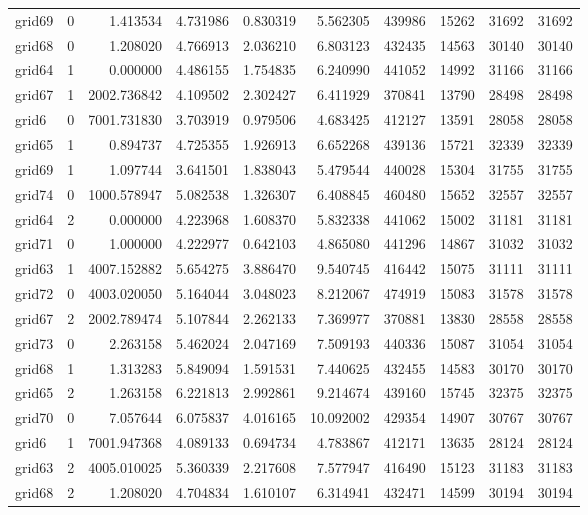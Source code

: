 \begin{longtable}{|l|r|r|r|r|r|r|r|r|r|}
grid69 & 0 & 1.413534 & 4.731986 & 0.830319 & 5.562305 & 439986 & 15262 & 31692 & 31692 \\
grid68 & 0 & 1.208020 & 4.766913 & 2.036210 & 6.803123 & 432435 & 14563 & 30140 & 30140 \\
grid64 & 1 & 0.000000 & 4.486155 & 1.754835 & 6.240990 & 441052 & 14992 & 31166 & 31166 \\
grid67 & 1 & 2002.736842 & 4.109502 & 2.302427 & 6.411929 & 370841 & 13790 & 28498 & 28498 \\
grid6 & 0 & 7001.731830 & 3.703919 & 0.979506 & 4.683425 & 412127 & 13591 & 28058 & 28058 \\
grid65 & 1 & 0.894737 & 4.725355 & 1.926913 & 6.652268 & 439136 & 15721 & 32339 & 32339 \\
grid69 & 1 & 1.097744 & 3.641501 & 1.838043 & 5.479544 & 440028 & 15304 & 31755 & 31755 \\
grid74 & 0 & 1000.578947 & 5.082538 & 1.326307 & 6.408845 & 460480 & 15652 & 32557 & 32557 \\
grid64 & 2 & 0.000000 & 4.223968 & 1.608370 & 5.832338 & 441062 & 15002 & 31181 & 31181 \\
grid71 & 0 & 1.000000 & 4.222977 & 0.642103 & 4.865080 & 441296 & 14867 & 31032 & 31032 \\
grid63 & 1 & 4007.152882 & 5.654275 & 3.886470 & 9.540745 & 416442 & 15075 & 31111 & 31111 \\
grid72 & 0 & 4003.020050 & 5.164044 & 3.048023 & 8.212067 & 474919 & 15083 & 31578 & 31578 \\
grid67 & 2 & 2002.789474 & 5.107844 & 2.262133 & 7.369977 & 370881 & 13830 & 28558 & 28558 \\
grid73 & 0 & 2.263158 & 5.462024 & 2.047169 & 7.509193 & 440336 & 15087 & 31054 & 31054 \\
grid68 & 1 & 1.313283 & 5.849094 & 1.591531 & 7.440625 & 432455 & 14583 & 30170 & 30170 \\
grid65 & 2 & 1.263158 & 6.221813 & 2.992861 & 9.214674 & 439160 & 15745 & 32375 & 32375 \\
grid70 & 0 & 7.057644 & 6.075837 & 4.016165 & 10.092002 & 429354 & 14907 & 30767 & 30767 \\
grid6 & 1 & 7001.947368 & 4.089133 & 0.694734 & 4.783867 & 412171 & 13635 & 28124 & 28124 \\
grid63 & 2 & 4005.010025 & 5.360339 & 2.217608 & 7.577947 & 416490 & 15123 & 31183 & 31183 \\
grid68 & 2 & 1.208020 & 4.704834 & 1.610107 & 6.314941 & 432471 & 14599 & 30194 & 30194 \\

\end{longtable}
